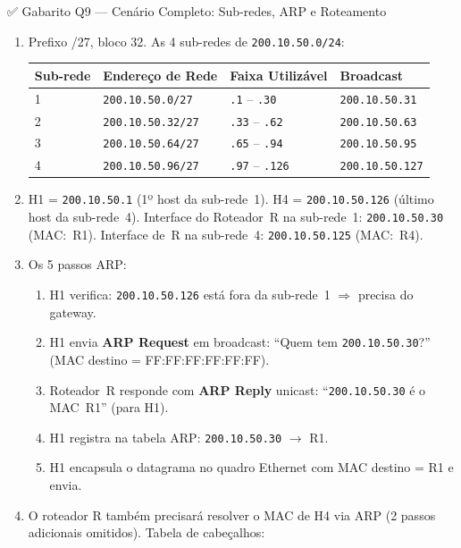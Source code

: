 \documentclass[11pt,a4paper]{article}
\begin{document}
\begin{gabaritocaixa}{✅ Gabarito Q9 --- Cenário Completo: Sub-redes, ARP e Roteamento}
\begin{enumerate}[label=(\alph*)]
    \item Prefixo /27, bloco 32. As 4 sub-redes de \texttt{200.10.50.0/24}:
\begin{center}
\begin{tabular}{llll}
\toprule
\textbf{Sub-rede} & \textbf{Endereço de Rede} & \textbf{Faixa Utilizável} & \textbf{Broadcast} \\
\midrule
1 & \texttt{200.10.50.0/27} & \texttt{.1} -- \texttt{.30} & \texttt{200.10.50.31} \\
2 & \texttt{200.10.50.32/27} & \texttt{.33} -- \texttt{.62} & \texttt{200.10.50.63} \\
3 & \texttt{200.10.50.64/27} & \texttt{.65} -- \texttt{.94} & \texttt{200.10.50.95} \\
4 & \texttt{200.10.50.96/27} & \texttt{.97} -- \texttt{.126} & \texttt{200.10.50.127} \\
\bottomrule
\end{tabular}
\end{center}
    \item H1 = \texttt{200.10.50.1} (1º host da sub-rede~1). H4 = \texttt{200.10.50.126} (último host da sub-rede~4). Interface do Roteador~R na sub-rede~1: \texttt{200.10.50.30} (MAC:~R1). Interface de~R na sub-rede~4: \texttt{200.10.50.125} (MAC:~R4).
    \item Os 5 passos ARP:
    \begin{enumerate}[label=\arabic*.]
        \item H1 verifica: \texttt{200.10.50.126} está fora da sub-rede~1 $\Rightarrow$ precisa do gateway.
        \item H1 envia \textbf{ARP Request} em broadcast: ``Quem tem \texttt{200.10.50.30}?'' (MAC destino = FF:FF:FF:FF:FF:FF).
        \item Roteador~R responde com \textbf{ARP Reply} unicast: ``\texttt{200.10.50.30} é o MAC~R1'' (para H1).
        \item H1 registra na tabela ARP: \texttt{200.10.50.30} $\to$ R1.
        \item H1 encapsula o datagrama no quadro Ethernet com MAC destino = R1 e envia.
    \end{enumerate}
    \item O roteador R também precisará resolver o MAC de H4 via ARP (2 passos adicionais omitidos). Tabela de cabeçalhos:

\end{enumerate}
\end{gabaritocaixa}
\end{document}
